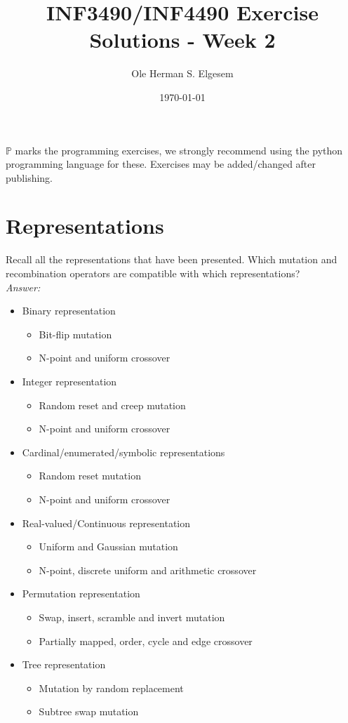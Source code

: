 \documentclass{article}           %
\title{\vspace{-2cm}INF3490/INF4490 Exercise Solutions - Week 2}
\author{Ole Herman S. Elgesem}
\date{\today}
\newcommand\marginsymbol[1][0pt]{%
  \tabto*{0cm}\makebox[\dimexpr-1cm-#1\relax][r]{$\mathbb{P}$}\tabto*{\TabPrevPos}}
\begin{document}
    \renewcommand\marginsymbol[1][0pt]{%
  \tabto*{0cm}\makebox[-1cm][c]{$\mathbb{P}$}\tabto*{\TabPrevPos}}

\maketitle
\(\mathbb{P}\) marks the programming exercises, we strongly recommend using
the python programming language for these. Exercises may be added/changed
after publishing.

\section{Representations}
Recall all the representations that have been presented. Which mutation and
recombination operators are compatible with which representations?\\

\emph{Answer:}

\begin{itemize}
    \item Binary representation
    \begin{itemize}
        \item Bit-flip mutation
        \item N-point and uniform crossover
    \end{itemize}
    \item Integer representation
    \begin{itemize}
        \item Random reset and creep mutation
        \item N-point and uniform crossover
    \end{itemize}
    \item Cardinal/enumerated/symbolic representations
    \begin{itemize}
        \item Random reset mutation
        \item N-point and uniform crossover
    \end{itemize}
    \item Real-valued/Continuous representation
    \begin{itemize}
        \item Uniform and Gaussian mutation
        \item N-point, discrete uniform and arithmetic crossover
    \end{itemize}
    \item Permutation representation
    \begin{itemize}
        \item Swap, insert, scramble and invert mutation
        \item Partially mapped, order, cycle and edge crossover
    \end{itemize}
    \item Tree representation
    \begin{itemize}
        \item Mutation by random replacement
        \item Subtree swap mutation
    \end{itemize}
\end{itemize}
\end{document}
